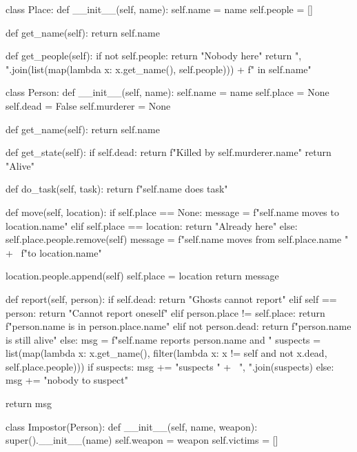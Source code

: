 \begin{python}
class Place:
    def __init__(self, name):
        self.name = name
        self.people = []

    def get_name(self):
        return self.name

    def get_people(self):
        if not self.people:
            return "Nobody here"
        return ", ".join(list(map(lambda x: x.get_name(),
                                  self.people))) + f" in {self.name}"

class Person:
    def __init__(self, name):
        self.name = name
        self.place = None
        self.dead = False
        self.murderer = None

    def get_name(self):
        return self.name

    def get_state(self):
        if self.dead:
            return f"Killed by {self.murderer.name}"
        return "Alive"

    def do_task(self, task):
        return f"{self.name} does {task}"

    def move(self, location):
        if self.place == None:
            message = f"{self.name} moves to {location.name}"
        elif self.place == location:
            return "Already here"
        else:
            self.place.people.remove(self)
            message = f"{self.name} moves from {self.place.name} " + \
                      f"to {location.name}"

        location.people.append(self)
        self.place = location
        return message

    def report(self, person):
        if self.dead:
            return "Ghosts cannot report"
        elif self == person:
            return "Cannot report oneself"
        elif person.place != self.place:
            return f"{person.name} is in {person.place.name}"
        elif not person.dead:
            return f"{person.name} is still alive"
        else:
            msg = f"{self.name} reports {person.name} and "
            suspects = list(map(lambda x: x.get_name(),
                                filter(lambda x: x != self and not x.dead,
                                       self.place.people)))
            if suspects:
                msg += "suspects " + \
                       ", ".join(suspects)
            else:
                msg += "nobody to suspect"

            return msg

class Impostor(Person):
    def __init__(self, name, weapon):
        super().__init__(name)
        self.weapon = weapon
        self.victims = []


\end{python}
